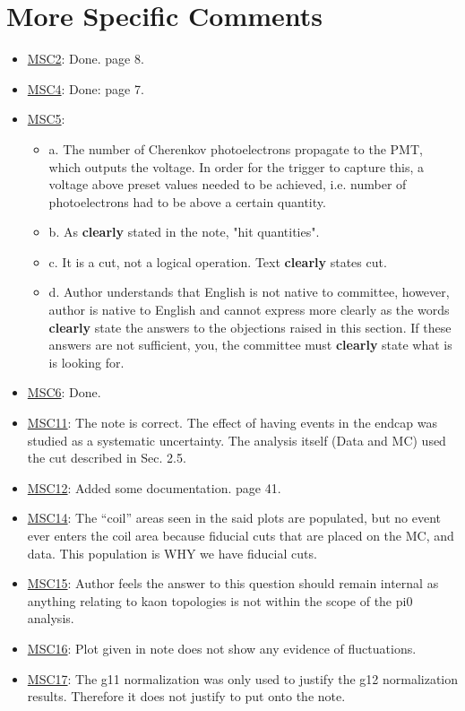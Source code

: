 \documentclass[11pt,a4paper]{article}
\begin{document}
\section{More Specific Comments} 
\begin{itemize}
	\item \underline{MSC2}: Done. page 8.
	\item \underline{MSC4}: Done: page 7.
    \item \underline{MSC5}: 
    \begin{itemize}
    	\item a. The number of Cherenkov photoelectrons propagate to the PMT, which outputs the voltage. In order for the trigger to capture this, a voltage above preset values needed to be achieved, i.e. number of photoelectrons had to be above a certain quantity. 
    	\item b. As \textbf{clearly} stated in the note, "hit quantities".
    	\item c. It is a cut, not a logical operation. Text \textbf{clearly} states cut.
    	\item d. Author understands that English is not native to committee, however, author is native to English and cannot express more clearly as the words \textbf{clearly} state the answers to the objections raised in this section. If these answers are not sufficient, you, the committee must \textbf{clearly} state what is is looking for. 
    \end{itemize}
	\item \underline{MSC6}: Done.
    \item \underline{MSC11}: The note is correct. The effect of having events in the endcap was studied as a systematic uncertainty. The analysis itself (Data and MC) used the cut described in Sec. 2.5. 
    \item \underline{MSC12}: Added some documentation. page 41.
    \item \underline{MSC14}: The ``coil'' areas seen in the said plots are populated, but no event ever enters the coil area because fiducial cuts that are placed on the MC, and data. This population is WHY we have fiducial cuts. 
    \item \underline{MSC15}: Author feels the answer to this question should remain internal as anything relating to kaon topologies is not within the scope of the pi0 analysis.
    \item \underline{MSC16}: Plot given in note does not show any evidence of fluctuations.
    \item \underline{MSC17}: The g11 normalization was only used to justify the g12 normalization results. Therefore it does not justify to put onto the note.

\end{itemize}
\end{document}
